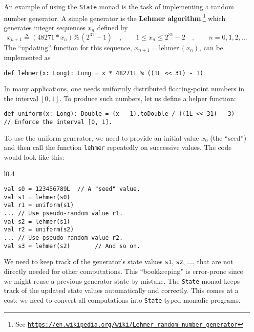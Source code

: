 An example of using the \lstinline!State! monad is the task of implementing
a random number generator. A simple generator is the \textbf{Lehmer
algorithm},\footnote{See \texttt{\href{https://en.wikipedia.org/wiki/Lehmer_random_number_generator}{https://en.wikipedia.org/wiki/Lehmer\_random\_number\_generator}}}
which generates integer sequences $x_{n}$ defined by
\[
x_{n+1}\triangleq\left(48271*x_{n}\right)\%\,(2^{31}-1)\quad,\quad\quad1\leq x_{n}\leq2^{31}-2\quad,\quad\quad n=0,1,2,...
\]
The \textsf{``}updating\textsf{''} function for this sequence, $x_{n+1}=\text{lehmer}\,(x_{n})$,
can be implemented as 
\begin{lstlisting}
def lehmer(x: Long): Long = x * 48271L % ((1L << 31) - 1)
\end{lstlisting}
In many applications, one needs uniformly distributed floating-point
numbers in the interval $\left[0,1\right]$. To produce such numbers,
let us define a helper function:
\begin{lstlisting}
def uniform(x: Long): Double = (x - 1).toDouble / ((1L << 31) - 3)   // Enforce the interval [0, 1].
\end{lstlisting}

To use the uniform generator, we need to provide an initial value
$x_{0}$ (the \textsf{``}seed\textsf{''}) and then call the function \lstinline!lehmer!
repeatedly on successive values. The code would look like this:

\begin{wrapfigure}{l}{0.4\columnwidth}%
\vspace{-0.8\baselineskip}
\begin{lstlisting}
val s0 = 123456789L  // A "seed" value.
val s1 = lehmer(s0)
val r1 = uniform(s1)
... // Use pseudo-random value r1.
val s2 = lehmer(s1)
val r2 = uniform(s2)
... // Use pseudo-random value r2.
val s3 = lehmer(s2)       // And so on.
\end{lstlisting}

\vspace{-1\baselineskip}
\end{wrapfigure}%

\noindent We need to keep track of the generator\textsf{'}s state values \lstinline!s1!,
\lstinline!s2!, ..., that are not directly needed for other computations.
This \textsf{``}bookkeeping\textsf{''} is error-prone since we might reuse a previous
generator state by mistake. The \lstinline!State! monad keeps track
of the updated state values automatically and correctly. This comes
at a cost: we need to convert all computations into \lstinline!State!-typed
monadic programs.

